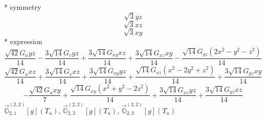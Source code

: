 \documentclass[fleqn,8pt]{jsarticle}
\begin{document}
\noindent\quad ** symmetry
\begin{dmath*}
\sqrt{3} y z
\end{dmath*}
\begin{dmath*}
\sqrt{3} x z
\end{dmath*}
\begin{dmath*}
\sqrt{3} x y
\end{dmath*}
\noindent\quad ** expression
\begin{dmath*}
\frac{\sqrt{42} G_{u} y z}{14} - \frac{3 \sqrt{14} G_{v} y z}{14} + \frac{3 \sqrt{14} G_{xy} x z}{14} + \frac{3 \sqrt{14} G_{xz} x y}{14} - \frac{\sqrt{14} G_{yz} \left(2 x^{2} - y^{2} - z^{2}\right)}{14}
\end{dmath*}
\begin{dmath*}
\frac{\sqrt{42} G_{u} x z}{14} + \frac{3 \sqrt{14} G_{v} x z}{14} + \frac{3 \sqrt{14} G_{xy} y z}{14} + \frac{\sqrt{14} G_{xz} \left(x^{2} - 2 y^{2} + z^{2}\right)}{14} + \frac{3 \sqrt{14} G_{yz} x y}{14}
\end{dmath*}
\begin{dmath*}
- \frac{\sqrt{42} G_{u} x y}{7} + \frac{\sqrt{14} G_{xy} \left(x^{2} + y^{2} - 2 z^{2}\right)}{14} + \frac{3 \sqrt{14} G_{xz} y z}{14} + \frac{3 \sqrt{14} G_{yz} x z}{14}
\end{dmath*}
\noindent\quad $\vec{\mathbb{G}}_{2,1}^{(2,2)}[g](T_{u})$, $\vec{\mathbb{G}}_{2,2}^{(2,2)}[g](T_{u})$, $\vec{\mathbb{G}}_{2,3}^{(2,2)}[g](T_{u})$
\end{document}
